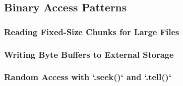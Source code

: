\subsection{Binary Access Patterns}
\subsubsection{Reading Fixed-Size Chunks for Large Files}
\subsubsection{Writing Byte Buffers to External Storage}
\subsubsection{Random Access with `.seek()` and `.tell()`}
